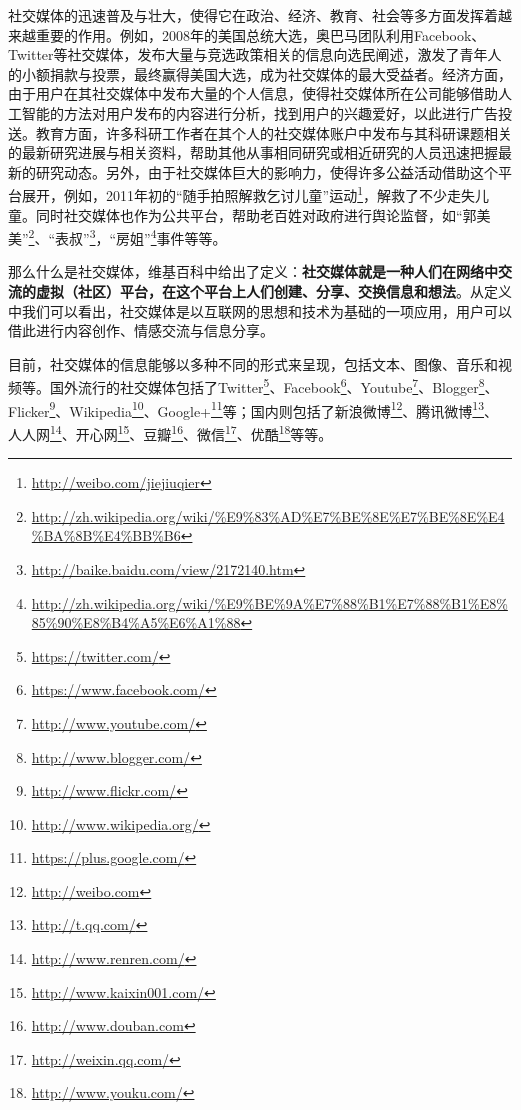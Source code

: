 社交媒体的迅速普及与壮大，使得它在政治、经济、教育、社会等多方面发挥着越来越重要的作用。例如，2008年的美国总统大选，奥巴马团队利用Facebook、Twitter等社交媒体，发布大量与竞选政策相关的信息向选民阐述，激发了青年人的小额捐款与投票，最终赢得美国大选，成为社交媒体的最大受益者。经济方面，由于用户在其社交媒体中发布大量的个人信息，使得社交媒体所在公司能够借助人工智能的方法对用户发布的内容进行分析，找到用户的兴趣爱好，以此进行广告投送。教育方面，许多科研工作者在其个人的社交媒体账户中发布与其科研课题相关的最新研究进展与相关资料，帮助其他从事相同研究或相近研究的人员迅速把握最新的研究动态。另外，由于社交媒体巨大的影响力，使得许多公益活动借助这个平台展开，例如，2011年初的“随手拍照解救乞讨儿童”运动\footnote{\url{http://weibo.com/jiejiuqier}}，解救了不少走失儿童。同时社交媒体也作为公共平台，帮助老百姓对政府进行舆论监督，如“郭美美”\footnote{\url{http://zh.wikipedia.org/wiki/\%E9\%83\%AD\%E7\%BE\%8E\%E7\%BE\%8E\%E4\%BA\%8B\%E4\%BB\%B6}}、“表叔”\footnote{\url{http://baike.baidu.com/view/2172140.htm}}，“房姐”\footnote{\url{http://zh.wikipedia.org/wiki/\%E9\%BE\%9A\%E7\%88\%B1\%E7\%88\%B1\%E8\%85\%90\%E8\%B4\%A5\%E6\%A1\%88}}事件等等。




那么什么是社交媒体，维基百科中给出了定义：\textbf{社交媒体就是一种人们在网络中交流的虚拟（社区）平台，在这个平台上人们创建、分享、交换信息和想法}。从定义中我们可以看出，社交媒体是以互联网的思想和技术为基础的一项应用，用户可以借此进行内容创作、情感交流与信息分享。

目前，社交媒体的信息能够以多种不同的形式来呈现，包括文本、图像、音乐和视频等。国外流行的社交媒体包括了Twitter\footnote{\url{https://twitter.com/}}、Facebook\footnote{\url{https://www.facebook.com/}}、Youtube\footnote{\url{http://www.youtube.com/}}、Blogger\footnote{\url{http://www.blogger.com/}}、Flicker\footnote{\url{http://www.flickr.com/}}、Wikipedia\footnote{\url{http://www.wikipedia.org/}}、Google+\footnote{\url{https://plus.google.com/}}等；国内则包括了新浪微博\footnote{\url{http://weibo.com}}、腾讯微博\footnote{\url{http://t.qq.com/}}、人人网\footnote{\url{http://www.renren.com/}}、开心网\footnote{\url{http://www.kaixin001.com/}}、豆瓣\footnote{\url{http://www.douban.com}}、微信\footnote{\url{http://weixin.qq.com/}}、优酷\footnote{\url{http://www.youku.com/}}等等。

